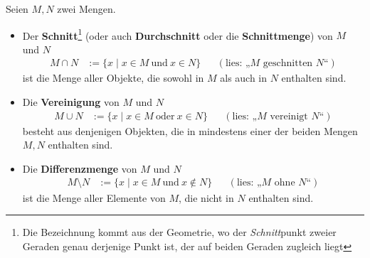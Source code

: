 \begin{defin}      \label{def:capcup}
    Seien $M,N$ zwei Mengen.
    \begin{itemize}
        \item Der \textbf{Schnitt}\footnote{Die Bezeichnung kommt aus der Geometrie, wo der \emph{Schnitt}punkt zweier Geraden genau derjenige Punkt ist, der auf beiden Geraden zugleich liegt} (oder auch \textbf{Durchschnitt} oder die \textbf{Schnittmenge}) von $M$ und $N$
        \begin{align*}
            M \cap N & := \{x \mid x \in M\ \text{und}\ x \in N\} && (\text{lies: „$M$ geschnitten $N$“})
        \end{align*}
        ist die Menge aller Objekte, die sowohl in $M$ als auch in $N$ enthalten sind.
        \item Die \textbf{Vereinigung} von $M$ und $N$
        \begin{align*}
            M \cup N & := \{x \mid x \in M\ \text{oder}\ x \in N\} && (\text{lies: „$M$ vereinigt $N$“})
        \end{align*}
        besteht aus denjenigen Objekten, die in mindestens einer der beiden Mengen $M,N$ enthalten sind.
        \item Die \textbf{Differenzmenge} von $M$ und $N$
        \begin{align*}
            M \setminus N & := \{ x \mid x \in M \ \text{und}\ x \notin N \}  && (\text{lies: „$M$ ohne $N$“})
        \end{align*}
        ist die Menge aller Elemente von $M$, die nicht in $N$ enthalten sind.


\end{itemize}
\end{defin}
